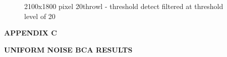 \documentclass[12pt, oneside]{book}
\begin{document}
\begin{figure}[!b]
  \centering
  \caption[2100x1800 pixel 20throwl]{2100x1800 pixel 20throwl - threshold detect filtered at threshold level of 20}
  \label{fig:20thr_owl_png}
\end{figure}

\clearpage

%
% 
\begin{center}
\textbf{APPENDIX C}

\textbf{UNIFORM NOISE BCA RESULTS}
\end{center}
\end{document}

